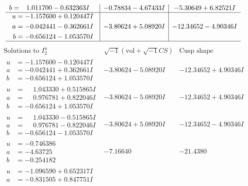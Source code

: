 \documentclass[1p]{elsarticle_modified}
\theoremstyle{definition}
\newcommand{\I}{\sqrt{-1}}
\begin{document}
$$\begin{array}{c|c|c}
\begin{aligned}
b &= \phantom{-}1.011700 - 0.632363 I\end{aligned}
 & -0.78834 - 4.67433 I & -5.30649 + 6.82521 I \\ \hline\begin{aligned}
u &= -1.157600 + 0.120447 I \\
a &= -0.042441 - 0.362661 I \\
b &= -0.656124 - 1.053570 I\end{aligned}
 & -3.80624 + 5.08920 I & -12.34652 - 4.90346 I\\
 \hline 
 \end{array}$$\newpage$$\begin{array}{c|c|c}  
\text{Solutions to }I^u_{2}& \I (\text{vol} + \sqrt{-1}CS) & \text{Cusp shape}\\
 \hline 
\begin{aligned}
u &= -1.157600 - 0.120447 I \\
a &= -0.042441 + 0.362661 I \\
b &= -0.656124 + 1.053570 I\end{aligned}
 & -3.80624 - 5.08920 I & -12.34652 + 4.90346 I \\ \hline\begin{aligned}
u &= \phantom{-}1.043330 + 0.515865 I \\
a &= \phantom{-}0.976781 + 0.822046 I \\
b &= -0.656124 + 1.053570 I\end{aligned}
 & -3.80624 - 5.08920 I & -12.34652 + 4.90346 I \\ \hline\begin{aligned}
u &= \phantom{-}1.043330 - 0.515865 I \\
a &= \phantom{-}0.976781 - 0.822046 I \\
b &= -0.656124 - 1.053570 I\end{aligned}
 & -3.80624 + 5.08920 I & -12.34652 - 4.90346 I \\ \hline\begin{aligned}
u &= -0.746386\phantom{ +0.000000I} \\
a &= -4.63725\phantom{ +0.000000I} \\
b &= -0.254182\phantom{ +0.000000I}\end{aligned}
 & -7.16640\phantom{ +0.000000I} & -21.4380\phantom{ +0.000000I} \\ \hline\begin{aligned}
u &= -1.096590 + 0.652317 I \\
a &= -0.831505 + 0.847751 I \\

\end{aligned}
\end{array}$$
\end{document}
